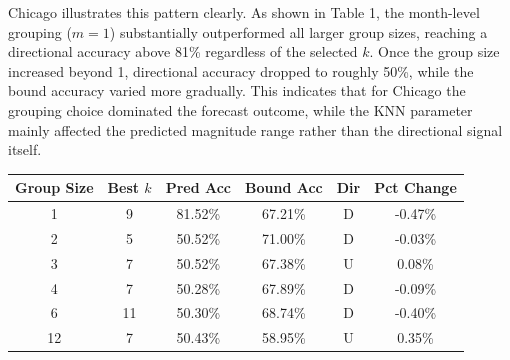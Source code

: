 \documentclass{article}
\begin{document}
Chicago illustrates this pattern clearly. As shown in Table 1, the month-level grouping ($m=1$) substantially outperformed all larger group sizes, reaching a directional accuracy above 81\% regardless of the selected $k$. Once the group size increased beyond 1, directional accuracy dropped to roughly 50\%, while the bound accuracy varied more gradually. This indicates that for Chicago the grouping choice dominated the forecast outcome, while the KNN parameter mainly affected the predicted magnitude range rather than the directional signal itself.

\begin{center}
\begin{tabular}{cccccc}
\hline
\textbf{Group Size} & \textbf{Best $k$} & \textbf{Pred Acc} & \textbf{Bound Acc} & \textbf{Dir} & \textbf{Pct Change} \\ \hline
1 & 9 & 81.52\% & 67.21\% & D & -0.47\% \\
2 & 5 & 50.52\% & 71.00\% & D & -0.03\% \\
3 & 7 & 50.52\% & 67.38\% & U & 0.08\% \\
4 & 7 & 50.28\% & 67.89\% & D & -0.09\% \\
6 & 11 & 50.30\% & 68.74\% & D & -0.40\% \\
12 & 7 & 50.43\% & 58.95\% & U & 0.35\% \\ \hline
\end{tabular}
\end{center}
  
\end{document}
